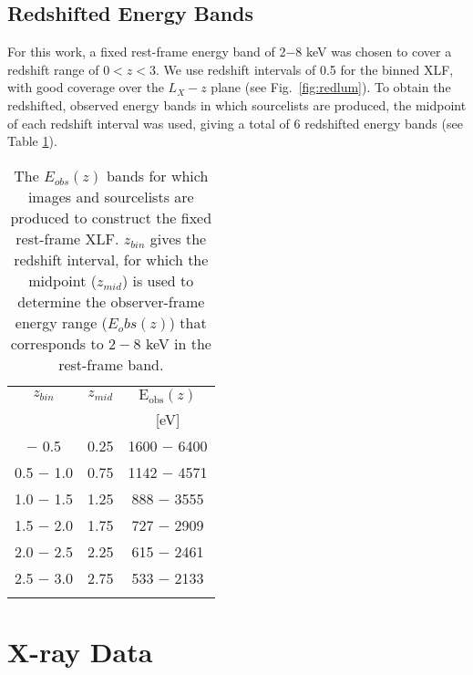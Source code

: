 \documentclass[fleqn,usenatbib]{mnras}
\begin{document}
	
	\subsection{Redshifted Energy Bands}\label{subsec:energybands}  

	For this work, a fixed rest-frame energy band of 2$-$8 keV was chosen to cover a redshift range of $0 < z < 3$.
    We use redshift intervals of 0.5 for the binned XLF, with good coverage over the $L_{X} - z$ plane (see Fig.~\ref{fig:redlum}).
    To obtain the redshifted, observed energy bands in which sourcelists are produced, the midpoint of each redshift interval was used, giving a total of 6 redshifted energy bands (see Table \ref{table:observedbands}).
        
        \setlength{\extrarowheight}{3pt}
        \begin{table}
        \caption{The $E_{obs}(z)$ bands for which images and sourcelists are produced to construct the fixed rest-frame XLF. $z_{bin}$ gives the redshift interval, for which the midpoint ($z_{mid}$) is used to determine the observer-frame energy range ($E_obs(z)$) that corresponds to $2-8$ keV in the rest-frame band.}
        \centering
        \begin{tabular}{ccc}
            \hline
            $z_{bin}$ & $z_{mid}$ & $\mathrm{E_{obs}}(z)$ \\
             & & [eV] \\
            \addlinespace[4pt]
            \hline
            0.0 $-$ 0.5 & 0.25 & 1600 $-$ 6400 \\
            0.5 $-$ 1.0 & 0.75 & 1142 $-$ 4571 \\
            1.0 $-$ 1.5 & 1.25 & 888  $-$ 3555 \\
            1.5 $-$ 2.0 & 1.75 & 727  $-$ 2909 \\
            2.0 $-$ 2.5 & 2.25 & 615  $-$ 2461 \\
            2.5 $-$ 3.0 & 2.75 & 533  $-$ 2133 \\
            \addlinespace[4pt]
            \hline
            \end{tabular}
        \label{table:observedbands}
        \end{table}
	


\section{X-ray Data}\label{sec:data}
\end{document}
